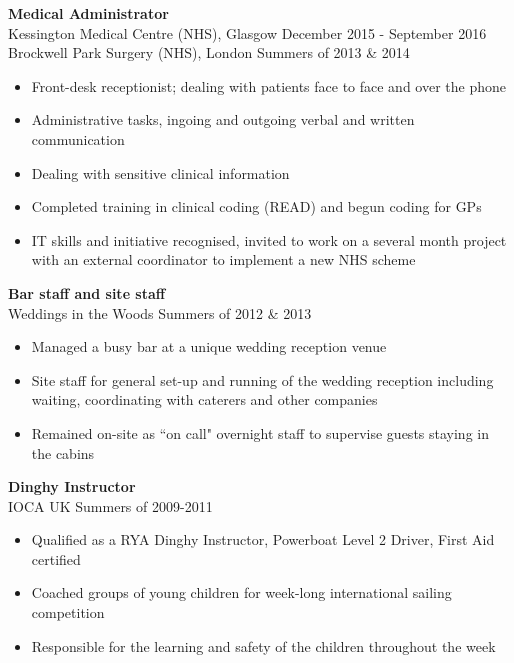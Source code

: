 \documentclass[margin, line, 10pt]{res} %
\begin{document}
\begin{resume}
\textbf{Medical Administrator} \\
Kessington Medical Centre (NHS), Glasgow \hfill December 2015 - September 2016\\
Brockwell Park Surgery (NHS), London \hfill Summers of 2013 \& 2014 \\
\begin{itemize} \itemsep -2pt %
\item Front-desk receptionist; dealing with patients face to face and over the phone
\item Administrative tasks, ingoing and outgoing verbal and written communication
\item Dealing with sensitive clinical information
\item Completed training in clinical coding (READ) and begun coding for GPs
\item IT skills and initiative recognised, invited to work on a several month project with an external coordinator to implement a new NHS scheme
\end{itemize}
 
\textbf{Bar staff and site staff} \\
Weddings in the Woods \hfill Summers of 2012 \& 2013 \\
\begin{itemize} 
\item Managed a busy bar at a unique wedding reception venue
\item Site staff for general set-up and running of the wedding reception including waiting, coordinating with caterers and other companies
\item Remained on-site as ``on call" overnight staff to supervise guests staying in the cabins    
\end{itemize} 

\textbf{Dinghy Instructor} \\
IOCA UK \hfill Summers of 2009-2011 \\
\begin{itemize} 
\item Qualified as a RYA Dinghy Instructor, Powerboat Level 2 Driver, First Aid certified
\item Coached groups of young children for week-long international sailing competition 
\item Responsible for the learning and safety of the children throughout the week
\end{itemize} 


\end{resume}
\end{document}
